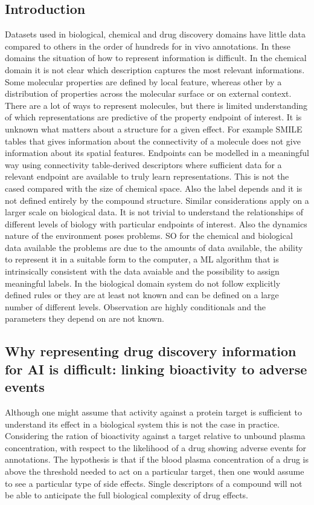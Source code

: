 	\subsection{Introduction}
	Datasets used in biological, chemical and drug discovery domains have little data compared to others in the order of hundreds for in vivo annotations.
	In these domains the situation of how to represent information is difficult.
	In the chemical domain it is not clear which description captures the most relevant informations.
	Some molecular properties are defined by local feature, whereas other by a distribution of properties across the molecular surface or on external context.
	There are a lot of ways to represent molecules, but there is limited understanding of which representations are predictive of the property endpoint of interest.
	It is unknown what matters about a structure for a given effect.
	For example SMILE tables that gives information about the connectivity of a molecule does not give information about its spatial features.
	Endpoints can be modelled in a meaningful way using connectivity table-derived descriptors where sufficient data for a relevant endpoint are available to truly learn representations.
	This is not the cased compared with the size of chemical space.
	Also the label depends and it is not defined entirely by the compound structure.
	Similar considerations apply on a larger scale on biological data.
	It is not trivial to understand the relationships of different levels of biology with particular endpoints of interest.
	Also the dynamics nature of the environment poses problems.
	SO for the chemical and biological data available the problems are due to the amounts of data available, the ability to represent it in a suitable form to the computer, a ML algorithm that is intrinsically consistent with the data avaiable and the possibility to assign meaningful labels.
	In the biological domain system do not follow explicitly defined rules or they are at least not known and can be defined on a large number of different levels.
	Observation are highly conditionals and the parameters they depend on are not known.

	\subsection{Why representing drug discovery information for AI is difficult: linking bioactivity to adverse events}
	Although one might assume that activity against a protein target is sufficient to understand its effect in a biological system this is not the case in practice.
	Considering the ration of bioactivity against a target relative to unbound plasma concentration, with respect to the likelihood of a drug showing adverse events for annotations.
	The hypothesis is that if the blood plasma concentration of a drug is above the threshold needed to act on a particular target, then one would assume to see a particular type of side effects.
	Single descriptors of a compound will not be able to anticipate the full biological complexity of drug effects.


